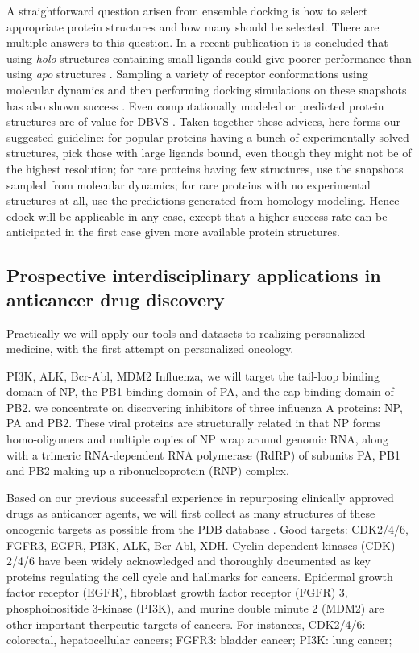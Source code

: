 \documentclass[a4paper,12pt]{article}
\begin{document}
A straightforward question arisen from ensemble docking is how to select appropriate protein structures and how many should be selected. There are multiple answers to this question. In a recent publication it is concluded that using \textit{holo} structures containing small ligands could give poorer performance than using \textit{apo} structures \citep{1704}. Sampling a variety of receptor conformations using molecular dynamics and then performing docking simulations on these snapshots has also shown success \citep{1730}. Even computationally modeled or predicted protein structures are of value for DBVS \citep{1322,1277}. Taken together these advices, here forms our suggested guideline: for popular proteins having a bunch of experimentally solved structures, pick those with large ligands bound, even though they might not be of the highest resolution; for rare proteins having few structures, use the snapshots sampled from molecular dynamics; for rare proteins with no experimental structures at all, use the predictions generated from homology modeling. Hence edock will be applicable in any case, except that a higher success rate can be anticipated in the first case given more available protein structures.

\subsection*{Prospective interdisciplinary applications in anticancer drug discovery}

Practically we will apply our tools and datasets to realizing personalized medicine, with the first attempt on personalized oncology.

PI3K, ALK, Bcr-Abl, MDM2
Influenza, we will target the tail-loop binding domain of NP, the PB1-binding domain of PA, and the cap-binding domain of PB2. we concentrate on discovering inhibitors of three influenza A proteins: NP, PA and PB2. These viral proteins are structurally related in that NP forms homo-oligomers and multiple copies of NP wrap around genomic RNA, along with a trimeric RNA-dependent RNA polymerase (RdRP) of subunits PA, PB1 and PB2 making up a ribonucleoprotein (RNP) complex.

Based on our previous successful experience in repurposing clinically approved drugs as anticancer agents, we will first collect as many structures of these oncogenic targets as possible from the PDB database \citep{537}. Good targets: CDK2/4/6, FGFR3, EGFR, PI3K, ALK, Bcr-Abl, XDH. Cyclin-dependent kinases (CDK) 2/4/6 have been widely acknowledged and thoroughly documented as key proteins regulating the cell cycle and hallmarks for cancers. Epidermal growth factor receptor (EGFR), fibroblast growth factor receptor (FGFR) 3, phosphoinositide 3-kinase (PI3K), and murine double minute 2 (MDM2) are other important therpeutic targets of cancers. For instances, CDK2/4/6: colorectal, hepatocellular cancers; FGFR3: bladder cancer; PI3K: lung cancer;
\end{document}
